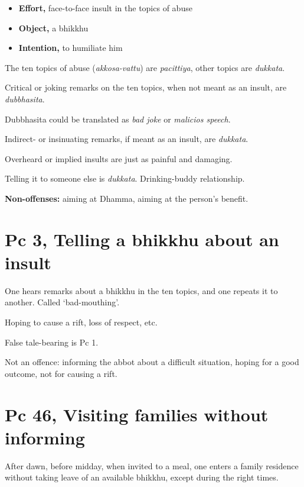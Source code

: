 \begin{multicols}{2}

\begin{itemize}
\tightlist
\item
  \textbf{Effort,} face-to-face insult in the topics of abuse
\item
  \textbf{Object,} a bhikkhu
\item
  \textbf{Intention,} to humiliate him
\end{itemize}

The ten topics of abuse (\emph{akkosa-vattu}) are \emph{pacittiya},
other topics are \emph{dukkata}.

Critical or joking remarks on the ten topics, when not meant as an
insult, are \emph{dubbhasita}.

Dubbhasita could be translated as \emph{bad joke} or \emph{malicios
speech}.

Indirect- or insinuating remarks, if meant as an insult, are
\emph{dukkata}.

Overheard or implied insults are just as painful and damaging.

Telling it to someone else is \emph{dukkata}. Drinking-buddy
relationship.


\textbf{Non-offenses:} aiming at Dhamma, aiming at the person's benefit.

\end{multicols}

\section{Pc 3, Telling a bhikkhu about an insult}

One hears remarks about a bhikkhu in the ten topics, and one repeats it
to another. Called `bad-mouthing'.

Hoping to cause a rift, loss of respect, etc.

False tale-bearing is Pc 1.

Not an offence: informing the abbot about a difficult situation, hoping
for a good outcome, not for causing a rift.

\section{Pc 46, Visiting families without informing}

After dawn, before midday, when invited to a meal, one enters a family
residence without taking leave of an available bhikkhu, except during
the right times.


